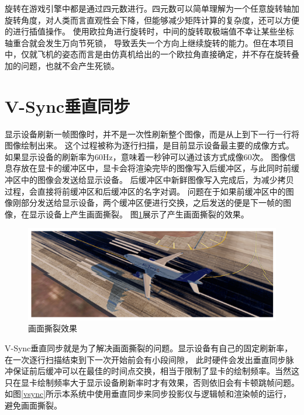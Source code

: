 \par 
旋转在游戏引擎中都是通过四元数进行。四元数可以简单理解为一个任意旋转轴加旋转角度，对人类而言直观性会下降，但能够减少矩阵计算的复杂度，还可以方便的进行插值操作\cite{rotate2}。
使用欧拉角进行旋转时，中间的旋转取极端值不幸让某些坐标轴重合就会发生万向节死锁，
导致丢失一个方向上继续旋转的能力\cite{rotate3}。但在本项目中，仅就飞机的姿态而言是由仿真机给出的一个欧拉角直接确定，并不存在旋转叠加的问题，也就不会产生死锁。
\section{V-Sync垂直同步}
显示设备刷新一帧图像时，并不是一次性刷新整个图像，而是从上到下一行一行将图像绘制出来。
这个过程被称为逐行扫描，是目前显示设备最主要的成像方式。如果显示设备的刷新率为60Hz，意味着一秒钟可以通过该方式成像60次。
图像信息存放在显卡的缓冲区中，显卡会将渲染完毕的图像写入后缓冲区，与此同时前缓冲区中的图像会发送给显示设备。
后缓冲区中新鲜图像写入完成后，为减少拷贝过程，会直接将前缓冲区和后缓冲区的名字对调\cite{vsync1}。
问题在于如果前缓冲区中的图像刚部分发送给显示设备，两个缓冲区便进行交换，之后发送的便是下一帧的图像，在显示设备上产生画面撕裂。
图\ref{showtear}展示了产生画面撕裂的效果。
\begin{figure}[h!]
    \begin{center}
        \includegraphics[width=\textwidth]{pictures/showtear.png}
        \caption{画面撕裂效果}
        \label{showtear}
    \end{center}
\end{figure}
\par
V-Sync垂直同步就是为了解决画面撕裂的问题。显示设备有自己的固定刷新率，在一次逐行扫描结束到下一次开始前会有小段间隙，
此时硬件会发出垂直同步脉冲保证前后缓冲可以在最佳的时间点交换\cite{vsync2}，相当于限制了显卡的绘制频率。当然这只在显卡绘制频率大于显示设备刷新率时才有效果，否则依旧会有卡顿跳帧问题。
如图\ref{vsync}所示本系统中使用垂直同步来同步投影仪与逻辑帧和渲染帧的运行，避免画面撕裂。
